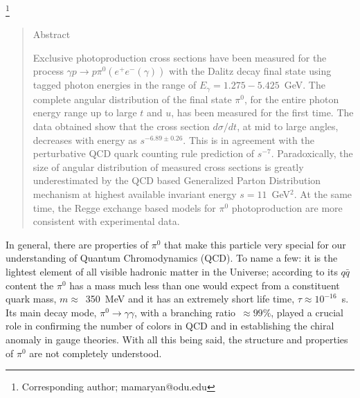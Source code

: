 \documentclass[aps,prc,twocolumn,floatfix,showpacs,preprintnumbers,amsmath,amssymb,superscriptaddress,linenumbers]{revtex4-1}
\begin{document}
\author {Michael~C.~Kunkel}
\affiliation{\ODU}
\affiliation{\IKP}
\author {Moskov~J.~Amaryan}
\thanks{Corresponding author; mamaryan@odu.edu}
\affiliation{\ODU}
\author {Igor~I.~Strakovsky}
\affiliation{\GWU}
\author {James~Ritman}
\affiliation{\IKP}
\affiliation{\BOCHUM}
\author{Gary~R.~Goldstein}
\affiliation{\TUFTS}
%
\vskip 1.50in
\vskip 2in

\begin{abstract}
\centerline{\Large Abstract}
\vskip 0.2in
Exclusive photoproduction cross sections have been measured for the process $\gamma p \rightarrow p\pi^0(e^+e^-(\gamma))$ with the Dalitz decay final state  using tagged photon energies in the range of $E_{\gamma} = 1.275-5.425$~GeV. The complete angular distribution of the final state $\pi^0$, for the entire photon energy range up to large $t$ and $u$, has been measured for the first time.
The data obtained show that the cross section $d\sigma/dt$, at mid to large angles, decreases with energy as $s^{-6.89\pm 0.26} $. This is in agreement with the perturbative QCD quark counting rule prediction of $s^{-7} $. Paradoxically, the size of angular distribution of measured cross sections is greatly underestimated by the QCD based Generalized Parton Distribution  mechanism at highest available invariant energy $s=11$~GeV$^2$. At the same time, the Regge exchange based models for $\pi^0$ photoproduction are more consistent with experimental data.
\end{abstract}

\maketitle

In general, there are  properties of $\pi^0$ that make this particle very special for our understanding of Quantum Chromodynamics (QCD). To name a few: it is the lightest element of all visible hadronic matter in the Universe; according to its $q \bar q$  content the $\pi^0$ has a mass much less than one would expect from a constituent quark mass, $m \approx$~350~MeV and it has an extremely short life time, $\tau \approx 10^{-16}$~s. Its main decay mode,   $\pi^0\rightarrow \gamma \gamma$, with a branching ratio~$\approx 99\%$, played a crucial role in confirming the number of colors in QCD and in establishing the chiral anomaly in gauge theories. With all this being said,  the structure and properties of $\pi^0$ are not completely understood. 
\end{document}
